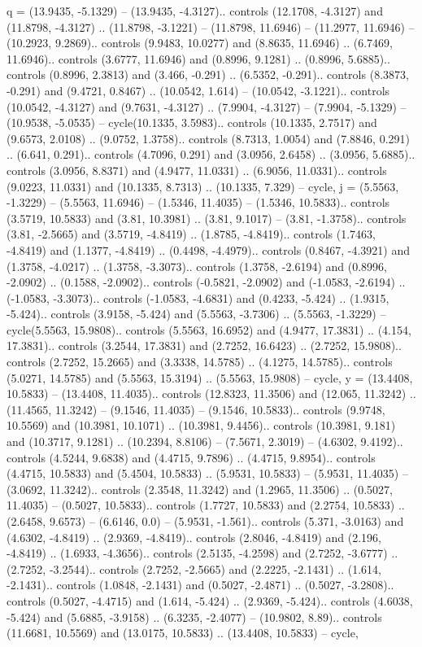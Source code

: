 {q} = {(13.9435, -5.1329) -- (13.9435, -4.3127).. controls (12.1708, -4.3127) and (11.8798, -4.3127) .. (11.8798, -3.1221) -- (11.8798, 11.6946) -- (11.2977, 11.6946) -- (10.2923, 9.2869).. controls (9.9483, 10.0277) and (8.8635, 11.6946) .. (6.7469, 11.6946).. controls (3.6777, 11.6946) and (0.8996, 9.1281) .. (0.8996, 5.6885).. controls (0.8996, 2.3813) and (3.466, -0.291) .. (6.5352, -0.291).. controls (8.3873, -0.291) and (9.4721, 0.8467) .. (10.0542, 1.614) -- (10.0542, -3.1221).. controls (10.0542, -4.3127) and (9.7631, -4.3127) .. (7.9904, -4.3127) -- (7.9904, -5.1329) -- (10.9538, -5.0535) -- cycle(10.1335, 3.5983).. controls (10.1335, 2.7517) and (9.6573, 2.0108) .. (9.0752, 1.3758).. controls (8.7313, 1.0054) and (7.8846, 0.291) .. (6.641, 0.291).. controls (4.7096, 0.291) and (3.0956, 2.6458) .. (3.0956, 5.6885).. controls (3.0956, 8.8371) and (4.9477, 11.0331) .. (6.9056, 11.0331).. controls (9.0223, 11.0331) and (10.1335, 8.7313) .. (10.1335, 7.329) -- cycle},
{j} = {(5.5563, -1.3229) -- (5.5563, 11.6946) -- (1.5346, 11.4035) -- (1.5346, 10.5833).. controls (3.5719, 10.5833) and (3.81, 10.3981) .. (3.81, 9.1017) -- (3.81, -1.3758).. controls (3.81, -2.5665) and (3.5719, -4.8419) .. (1.8785, -4.8419).. controls (1.7463, -4.8419) and (1.1377, -4.8419) .. (0.4498, -4.4979).. controls (0.8467, -4.3921) and (1.3758, -4.0217) .. (1.3758, -3.3073).. controls (1.3758, -2.6194) and (0.8996, -2.0902) .. (0.1588, -2.0902).. controls (-0.5821, -2.0902) and (-1.0583, -2.6194) .. (-1.0583, -3.3073).. controls (-1.0583, -4.6831) and (0.4233, -5.424) .. (1.9315, -5.424).. controls (3.9158, -5.424) and (5.5563, -3.7306) .. (5.5563, -1.3229) -- cycle(5.5563, 15.9808).. controls (5.5563, 16.6952) and (4.9477, 17.3831) .. (4.154, 17.3831).. controls (3.2544, 17.3831) and (2.7252, 16.6423) .. (2.7252, 15.9808).. controls (2.7252, 15.2665) and (3.3338, 14.5785) .. (4.1275, 14.5785).. controls (5.0271, 14.5785) and (5.5563, 15.3194) .. (5.5563, 15.9808) -- cycle},
{y} = {(13.4408, 10.5833) -- (13.4408, 11.4035).. controls (12.8323, 11.3506) and (12.065, 11.3242) .. (11.4565, 11.3242) -- (9.1546, 11.4035) -- (9.1546, 10.5833).. controls (9.9748, 10.5569) and (10.3981, 10.1071) .. (10.3981, 9.4456).. controls (10.3981, 9.181) and (10.3717, 9.1281) .. (10.2394, 8.8106) -- (7.5671, 2.3019) -- (4.6302, 9.4192).. controls (4.5244, 9.6838) and (4.4715, 9.7896) .. (4.4715, 9.8954).. controls (4.4715, 10.5833) and (5.4504, 10.5833) .. (5.9531, 10.5833) -- (5.9531, 11.4035) -- (3.0692, 11.3242).. controls (2.3548, 11.3242) and (1.2965, 11.3506) .. (0.5027, 11.4035) -- (0.5027, 10.5833).. controls (1.7727, 10.5833) and (2.2754, 10.5833) .. (2.6458, 9.6573) -- (6.6146, 0.0) -- (5.9531, -1.561).. controls (5.371, -3.0163) and (4.6302, -4.8419) .. (2.9369, -4.8419).. controls (2.8046, -4.8419) and (2.196, -4.8419) .. (1.6933, -4.3656).. controls (2.5135, -4.2598) and (2.7252, -3.6777) .. (2.7252, -3.2544).. controls (2.7252, -2.5665) and (2.2225, -2.1431) .. (1.614, -2.1431).. controls (1.0848, -2.1431) and (0.5027, -2.4871) .. (0.5027, -3.2808).. controls (0.5027, -4.4715) and (1.614, -5.424) .. (2.9369, -5.424).. controls (4.6038, -5.424) and (5.6885, -3.9158) .. (6.3235, -2.4077) -- (10.9802, 8.89).. controls (11.6681, 10.5569) and (13.0175, 10.5833) .. (13.4408, 10.5833) -- cycle},
